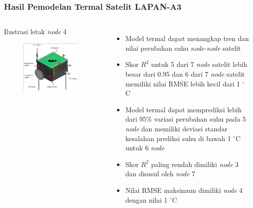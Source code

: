 \documentclass[8pt]{beamer}
\begin{document}
\begin{frame}
  \frametitle{Hasil Pemodelan Termal Satelit LAPAN-A3}
  \begin{columns}[T]
      \begin{block}{\center Ilustrasi letak \textit{node} 4}
      \begin{figure}
        \includegraphics[width=0.9\textwidth]{figure/node4.png}
      \end{figure}
      \end{block}
  \begin{itemize}
    \item Model termal dapat menangkap tren dan nilai perubahan suhu \textit{node-node} satelit
    \item Skor $R^2$ untuk 5 dari 7 \textit{node} satelit lebih besar dari 0.95 dan 6 dari 7 \textit{node} satelit memiliki nilai RMSE lebih kecil dari 1 $^\circ$C
    \item Model termal dapat memprediksi lebih dari 95\% variasi perubahan suhu pada 5 \textit{node} dan memiliki deviasi standar kesalahan prediksi suhu di bawah 1 $^\circ$C untuk 6 \textit{node}
    \item Skor $R^2$ paling rendah dimiliki \textit{node} 3 dan disusul oleh \textit{node} 7
    \item Nilai RMSE maksimum dimiliki \textit{node} 4 dengan nilai 1 $^\circ$C
  \end{itemize}
    \end{columns}
\end{frame}
\end{document}

